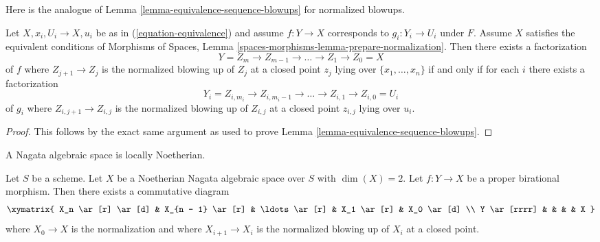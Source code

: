 \noindent
Here is the analogue of
Lemma \ref{lemma-equivalence-sequence-blowups}
for normalized blowups.

\begin{lemma}
\label{lemma-equivalence-sequence-normalized-blowups}
Let $X, x_i, U_i \to X, u_i$ be as in (\ref{equation-equivalence})
and assume $f : Y \to X$ corresponds to $g_i : Y_i \to U_i$ under $F$.
Assume $X$ satisfies the equivalent conditions of
Morphisms of Spaces, Lemma \ref{spaces-morphisms-lemma-prepare-normalization}.
Then there exists a factorization
$$
Y = Z_m \to Z_{m - 1} \to \ldots \to Z_1 \to Z_0 = X
$$
of $f$ where $Z_{j + 1} \to Z_j$ is the normalized blowing up of $Z_j$
at a closed point $z_j$ lying over $\{x_1, \ldots, x_n\}$ if and only if
for each $i$ there exists a factorization
$$
Y_i = Z_{i, m_i} \to Z_{i, m_i - 1} \to \ldots \to Z_{i, 1} \to Z_{i, 0} = U_i
$$
of $g_i$ where $Z_{i, j + 1} \to Z_{i, j}$ is the normalized blowing up of
$Z_{i, j}$ at a closed point $z_{i, j}$ lying over $u_i$.
\end{lemma}

\begin{proof}
This follows by the exact same argument as used to prove
Lemma \ref{lemma-equivalence-sequence-blowups}.
\end{proof}

\noindent
A Nagata algebraic space is locally Noetherian.

\begin{lemma}
\label{lemma-dominate-by-normalized-blowing-up}
Let $S$ be a scheme. Let $X$ be a Noetherian Nagata algebraic space over $S$
with $\dim(X) = 2$. Let $f : Y \to X$ be a proper birational morphism.
Then there exists a commutative diagram
$$
\xymatrix{
X_n \ar[r] \ar[d] &
X_{n - 1} \ar[r] &
\ldots \ar[r] &
X_1 \ar[r] &
X_0 \ar[d] \\
Y \ar[rrrr]  & & & & X
}
$$
where $X_0 \to X$ is the normalization and
where $X_{i + 1} \to X_i$ is the normalized blowing up of $X_i$ at a closed
point.
\end{lemma}


